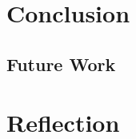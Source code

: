 \documentclass[11pt]{book}
\begin{document}
\chapter{Conclusion}


\section{Future Work}

\chapter{Reflection}

\printbibliography
\end{document}
